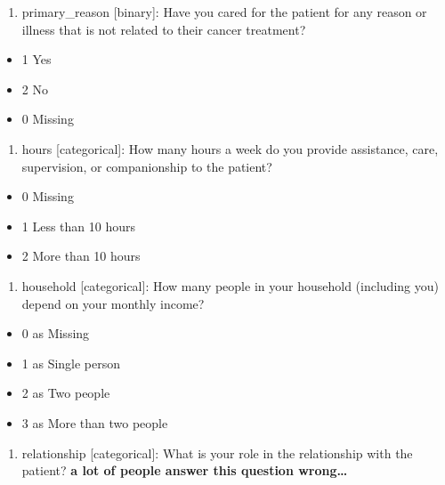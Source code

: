 \documentclass[
  letterpaper,
  DIV=11,
  numbers=noendperiod]{scrreprt}
\providecommand{\tightlist}{%
  \setlength{\itemsep}{0pt}\setlength{\parskip}{0pt}}\usepackage{longtable,booktabs,array}
\begin{document}
\begin{enumerate}
\def\labelenumi{\arabic{enumi}.}
\setcounter{enumi}{9}
\tightlist
\item
  primary\_reason {[}binary{]}: Have you cared for the patient for any
  reason or illness that is not related to their cancer treatment?
\end{enumerate}

\begin{itemize}
\tightlist
\item
  1 Yes
\item
  2 No
\item
  0 Missing
\end{itemize}

\begin{enumerate}
\def\labelenumi{\arabic{enumi}.}
\setcounter{enumi}{10}
\tightlist
\item
  hours {[}categorical{]}: How many hours a week do you provide
  assistance, care, supervision, or companionship to the patient?
\end{enumerate}

\begin{itemize}
\tightlist
\item
  0 Missing
\item
  1 Less than 10 hours
\item
  2 More than 10 hours
\end{itemize}

\begin{enumerate}
\def\labelenumi{\arabic{enumi}.}
\setcounter{enumi}{11}
\tightlist
\item
  household {[}categorical{]}: How many people in your household
  (including you) depend on your monthly income?
\end{enumerate}

\begin{itemize}
\tightlist
\item
  0 as Missing
\item
  1 as Single person
\item
  2 as Two people
\item
  3 as More than two people
\end{itemize}

\begin{enumerate}
\def\labelenumi{\arabic{enumi}.}
\setcounter{enumi}{12}
\tightlist
\item
  relationship {[}categorical{]}: What is your role in the relationship
  with the patient? \textbf{a lot of people answer this question
  wrong\ldots{}}
\end{enumerate}
\end{document}
